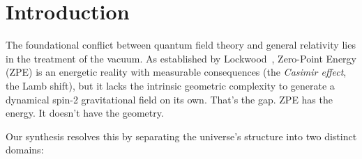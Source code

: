 \section{Introduction}\label{sec:fst_intro}

The foundational conflict between quantum field theory and general relativity lies in the treatment of the vacuum. As established by Lockwood~\cite{lockwood2025zpe}, Zero-Point Energy (ZPE) is an energetic reality with measurable consequences (the \emph{Casimir effect}, the Lamb shift), but it lacks the intrinsic geometric complexity to generate a dynamical spin-2 gravitational field on its own. That's the gap. ZPE has the energy. It doesn't have the geometry.

Our synthesis resolves this by separating the universe's structure into two distinct domains:
